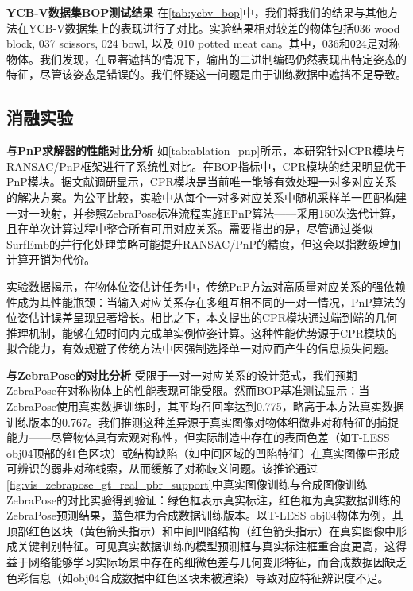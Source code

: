 \textbf{YCB-V数据集BOP测试结果 } 在\autoref{tab:ycbv_bop}中，我们将我们的结果与其他方法在YCB-V数据集上的表现进行了对比。实验结果相对较差的物体包括036 wood block, 037 scissors, 024 bowl, 以及 010 potted meat can。其中，036和024是对称物体。我们发现，在显著遮挡的情况下，输出的二进制编码仍然表现出特定姿态的特征，尽管该姿态是错误的。我们怀疑这一问题是由于训练数据中遮挡不足导致。



\subsection{消融实验}

\textbf{与PnP求解器的性能对比分析 } 如\autoref{tab:ablation_pnp}所示，本研究针对CPR模块与RANSAC/PnP框架进行了系统性对比。在BOP指标中，CPR模块的结果明显优于PnP模块。据文献调研显示，CPR模块是当前唯一能够有效处理一对多对应关系的解决方案。为公平比较，实验中从每个一对多对应关系中随机采样单一匹配构建一对一映射，并参照ZebraPose标准流程实施EPnP算法\cite{EPnP}——采用150次迭代计算，且在单次计算过程中整合所有可用对应关系。需要指出的是，尽管通过类似SurfEmb的并行化处理策略可能提升RANSAC/PnP的精度，但这会以指数级增加计算开销为代价。

\par 实验数据揭示，在物体位姿估计任务中，传统PnP方法对高质量对应关系的强依赖性成为其性能瓶颈：当输入对应关系存在多组互相不同的一对一情况，PnP算法的位姿估计误差呈现显著增长。相比之下，本文提出的CPR模块通过端到端的几何推理机制，能够在短时间内完成单实例位姿计算。这种性能优势源于CPR模块的拟合能力，有效规避了传统方法中因强制选择单一对应而产生的信息损失问题。



\textbf{与ZebraPose的对比分析 } 受限于一对一对应关系的设计范式，我们预期ZebraPose在对称物体上的性能表现可能受限。然而BOP基准测试显示：当ZebraPose使用真实数据训练时，其平均召回率达到0.775，略高于本方法真实数据训练版本的0.767。我们推测这种差异源于真实图像对物体细微非对称特征的捕捉能力——尽管物体具有宏观对称性，但实际制造中存在的表面色差（如T-LESS obj04顶部的红色区块）或结构缺陷（如中间区域的凹陷特征）在真实图像中形成可辨识的弱非对称线索，从而缓解了对称歧义问题。该推论通过\autoref{fig:vis_zebrapose_gt_real_pbr_support}中真实图像训练与合成图像训练ZebraPose的对比实验得到验证：绿色框表示真实标注，红色框为真实数据训练的ZebraPose预测结果，蓝色框为合成数据训练版本。以T-LESS obj04物体为例，其顶部红色区块（黄色箭头指示）和中间凹陷结构（红色箭头指示）在真实图像中形成关键判别特征。可见真实数据训练的模型预测框与真实标注框重合度更高，这得益于网络能够学习实际场景中存在的细微色差与几何变形特征，而合成数据因缺乏色彩信息（如obj04合成数据中红色区块未被渲染）导致对应特征辨识度不足。

